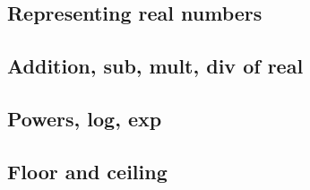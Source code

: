
\subsection{Representing real numbers}

\subsection{Addition, sub, mult, div of real}

\subsection{Powers, log, exp}

\subsection{Floor and ceiling}

